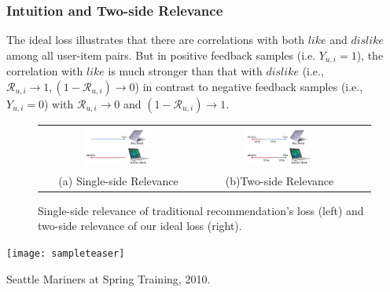 \documentclass[sigconf]{acmart}
\begin{document}
\subsubsection{Intuition and Two-side Relevance}
\label{sec:intuition}
The ideal loss illustrates that there are correlations with both $like$ and $dislike$ among all user-item pairs. But in positive feedback samples (i.e. $Y_{u, i} = 1$), the correlation with $like$ is much stronger than that with $dislike$ (i.e., $\mathcal{R}_{u,i} \to 1, \left(1-\mathcal{R}_{u,i}\right) \to 0$) in contrast to negative feedback samples (i.e., $Y_{u, i} = 0$) with $\mathcal{R}_{u,i} \to 0$ and $\left(1-\mathcal{R}_{u,i}\right) \to 1$. 
\begin{figure}[!htb]
	\begin{center}
		\begin{tabular}{ccc}
			\includegraphics[width=0.45\textwidth]  {fig/single-side.png} &
			\includegraphics[width=0.45\textwidth] {fig/two-side.png} \\
			(a) Single-side Relevance & (b)Two-side Relevance
		\end{tabular}
	\end{center}
	\caption{Single-side relevance of traditional recommendation's loss (left) and two-side relevance of our ideal loss (right).}
	\label{fig:intuition}
\end{figure}
\begin{teaserfigure}
	\texttt{[image: sampleteaser]}
	\caption{Seattle Mariners at Spring Training, 2010.}
	\label{fig:teaser}
\end{teaserfigure}
\end{document}
